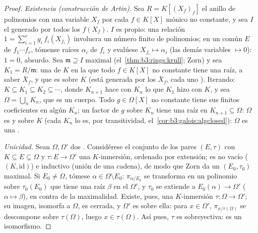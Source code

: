 \begin{proof}
\emph{Existencia (construcción de Artin).} Sea $R = K[(X_f)_f]$ el
anillo de polinomios con una variable $X_f$ por cada $f \in K[X]$ mónico
no constante, y sea $I$ el  generado
por todos los $f(X_f)$. $I$ es propio: una relación
$1 = \sum_{i=1}^r g_i\,
f_i(X_{f_i})$ involucra un número finito de polinomios; en un
 común $E$ de
$f_1\cdots f_r$, tómense raíces $\alpha_i$ de $f_i$ y evalúese
$X_{f_i} \mapsto \alpha_i$ (las demás variables $\mapsto 0$): $1 = 0$,
absurdo. Sea $\mathfrak m \supseteq I$ maximal
(el~\cref{thm:b3:rings:krull}; Zorn) y sea $K_1 = R/\mathfrak
m$: una  de $K$ en
la que todo $f \in
K[X]$ no constante tiene una raíz, a saber $\bar X_f$, y que es
 sobre $K$ (está generada
por los $\bar X_f$, cada uno
). Iterando:
$K \subseteq K_1 \subseteq K_2 \subseteq \cdots$, donde $K_{n+1}$ hace
con $K_n$ lo que $K_1$ hizo con $K$, y sea $\Omega =
\bigcup_n K_n$, que es un cuerpo. Todo $g \in \Omega[X]$ no constante
tiene sus finitos coeficientes en algún $K_n$; un factor
 de $g$ sobre $K_n$ tiene
una raíz en $K_{n+1} \subseteq
\Omega$: $\Omega$ es  y  sobre $K$ (cada
$K_n$ lo es, por transitividad, el~\cref{cor:b3:galois:algclosed}):
$\Omega$ es una .

\emph{Unicidad.} Sean $\Omega, \Omega'$ dos
. Considérese el
conjunto de los pares $(E, \tau)$ con $K
\subseteq E \subseteq \Omega$ y $\tau\colon E \to \Omega'$ una
$K$-inmersión, ordenado por extensión; es no vacío ($(K,
\mathrm{id})$) e inductivo (unión de una cadena), de modo que Zorn da un
$(E_0, \tau_0)$ maximal. Si $E_0 \neq \Omega$, tómese $\alpha \in
\Omega\setminus E_0$: $\pi_{\alpha/E_0}$ se transforma en un polinomio
sobre $\tau_0(E_0)$ que tiene una raíz $\beta$ en el
 $\Omega'$, y
$\tau_0$ se extiende a $E_0(\alpha) \to
\Omega'$ ($\alpha \mapsto \beta$), en contra de la maximalidad. Existe,
pues, una $K$-inmersión $\tau \colon \Omega \to \Omega'$; su imagen,
isomorfa a $\Omega$, es 
cerrada, y $\Omega'$ es 
sobre ella: para $x \in \Omega'$, $\pi_{x/\tau(\Omega)}$ se descompone
sobre $\tau(\Omega)$, luego $x \in
\tau(\Omega)$. Así pues, $\tau$ es sobreyectiva: es un isomorfismo.
\end{proof}

